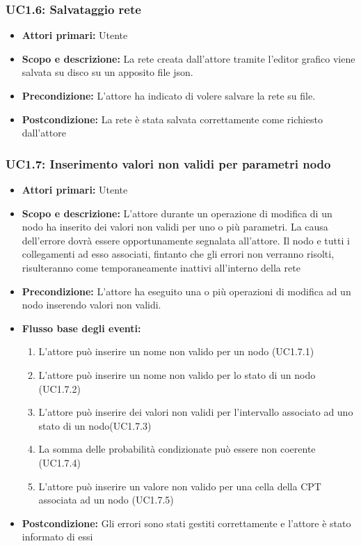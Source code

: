 \subsubsection{UC1.6: Salvataggio rete} 
\begin{itemize} 
	\item{\textbf{Attori primari:} Utente} 
	\item{\textbf{Scopo e descrizione:} La rete creata dall'attore tramite l'editor grafico viene salvata su disco su un apposito file json.} 
	\item{\textbf{Precondizione:} L'attore ha indicato di volere salvare la rete su file.} 
	\item{\textbf{Postcondizione:} La rete è stata salvata correttamente come richiesto dall'attore} 
\end{itemize} 
\subsubsection{UC1.7: Inserimento valori non validi per parametri nodo} 
\begin{itemize} 
	\item{\textbf{Attori primari:} Utente} 
	\item{\textbf{Scopo e descrizione:} L'attore durante un operazione di modifica di un nodo ha inserito dei valori non validi per uno o più parametri. La causa dell'errore dovrà essere opportunamente segnalata all'attore. Il nodo e tutti i collegamenti ad esso associati, fintanto che gli errori non verranno risolti, risulteranno come temporaneamente inattivi all'interno della rete} 
	\item{\textbf{Precondizione:} L'attore ha eseguito una o più operazioni di modifica ad un nodo inserendo valori non validi.} 
	\item{\textbf{Flusso base degli eventi:} } 
	\begin{enumerate} 
	\item{L'attore può inserire un nome non valido per un nodo (UC1.7.1)} 
	\item{L'attore può inserire un nome non valido per lo stato di un nodo (UC1.7.2)} 
	\item{L'attore può inserire dei valori non validi per l'intervallo associato ad uno stato di un nodo(UC1.7.3)} 
	\item{La somma delle probabilità condizionate può essere non coerente (UC1.7.4)} 
	\item{L'attore può inserire un valore non valido per una cella della CPT associata ad un nodo (UC1.7.5)} 
	\end{enumerate} 
	\item{\textbf{Postcondizione:} Gli errori sono stati gestiti correttamente e l'attore è stato informato di essi} 
\end{itemize} 
